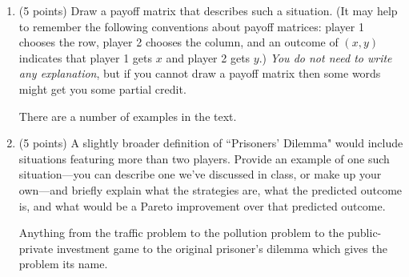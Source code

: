 \documentclass{article}
\newcommand{\mybigskip}{\vspace{1in}}
\begin{document}
\begin{enumerate}
    \begin{enumerate}

    \item \begin{EXAM} (5 points) Draw a payoff matrix that describes such a situation. (It may help to remember the following conventions about payoff matrices: player 1 chooses the row, player 2 chooses the column, and an outcome of $(x,y)$ indicates that player 1 gets $x$ and player 2 gets $y$.) \emph{You do not need to write any explanation}, but if you cannot draw a payoff matrix then some words might get you some partial credit. \mybigskip\bigskip\bigskip \end{EXAM}

    \begin{KEY} There are a number of examples in the text. \end{KEY}

    \item \begin{EXAM} (5 points) A slightly broader definition of ``Prisoners' Dilemma" would include situations featuring more than two players. Provide an example of one such situation---you can describe one we've discussed in class, or make up your own---and briefly explain what the strategies are, what the predicted outcome is, and what would be a Pareto improvement over that predicted outcome. \vspace*{4cm} \end{EXAM}

    \begin{KEY} Anything from the traffic problem to the pollution problem to the public-private investment game to the original prisoner's dilemma which gives the problem its name. %
\end{KEY}
    \end{enumerate}


















\end{enumerate}
\end{document}
